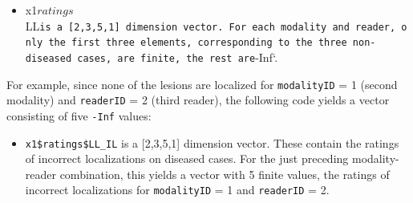 \documentclass[
]{book}
\newenvironment{Shaded}{\begin{snugshade}}{\end{snugshade}}
\newcommand{\CommentTok}[1]{\textcolor[rgb]{0.56,0.35,0.01}{\textit{#1}}}
\newcommand{\DecValTok}[1]{\textcolor[rgb]{0.00,0.00,0.81}{#1}}
\newcommand{\NormalTok}[1]{#1}
\newcommand{\SpecialCharTok}[1]{\textcolor[rgb]{0.00,0.00,0.00}{#1}}
\providecommand{\tightlist}{%
  \setlength{\itemsep}{0pt}\setlength{\parskip}{0pt}}
\begin{document}
\begin{Shaded}
\end{Shaded}

\begin{itemize}
\tightlist
\item
  x1\(ratings\)LL\texttt{is\ a\ {[}2,3,5,1{]}\ dimension\ vector.\ For\ each\ modality\ and\ reader,\ only\ the\ first\ three\ elements,\ corresponding\ to\ the\ three\ non-diseased\ cases,\ are\ finite,\ the\ rest\ are}-Inf`.
\end{itemize}

For example, since none of the lesions are localized for \texttt{modalityID} = 1 (second modality) and \texttt{readerID} = 2 (third reader), the following code yields a vector consisting of five \texttt{-Inf} values:

\begin{Shaded}
\end{Shaded}

\begin{itemize}
\tightlist
\item
  \texttt{x1\$ratings\$LL\_IL} is a {[}2,3,5,1{]} dimension vector. These contain the ratings of incorrect localizations on diseased cases. For the just preceding modality-reader combination, this yields a vector with 5 finite values, the ratings of incorrect localizations for \texttt{modalityID} = 1 and \texttt{readerID} = 2.
\end{itemize}

\begin{Shaded}
\end{Shaded}
\end{document}
